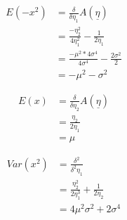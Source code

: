 \documentclass[11pt,fleqn]{book} %
\begin{document}
		\begin{align*}
			E(-x^2) &= \frac{\delta}{\delta\eta_1}A(\underline\eta)\\
				&= \frac{-\eta_2^2}{4\eta_1^2}-\frac{1}{2\eta_1}\\
				&= \frac{-\mu^2 * 4\sigma^4}{4 \sigma^4} - \frac{2\sigma^2}{2} \\
				&=-\mu^2-\sigma^2
		\end{align*}

		\begin{align*}
			E(x) &= \frac{\delta}{\delta\eta_2}A(\underline{\eta})\\
				&= \frac{\eta_2}{2\eta_1}\\
				&= \mu
		\end{align*}

		\begin{align*}
			Var(x^2) &= \frac{\delta^2}{\delta^2 \eta_1}\\
				&= \frac{\eta_2^2}{2\eta^3_1}+\frac{1}{2\eta_2}\\
				&= 4\mu^2\sigma^2+2\sigma^4
		\end{align*}
\end{document}
